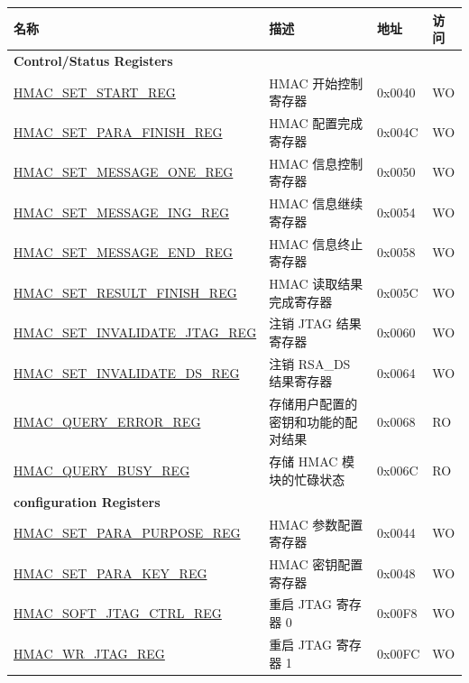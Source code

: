 \begin{longtable}{ | p{6cm} | p{7.2cm} | p{1.3cm} | p{1cm} | }
\hline\rowcolor{lightgray}
名称 & 描述 &  地址 & 访问 \\ \hline
\endhead
\multicolumn{4}{|l|}{\textbf{Control/Status Registers}} \\ \hline
\hyperref[regdesc:HMACSETSTARTREG]{HMAC\_SET\_START\_REG} & HMAC 开始控制寄存器 & 0x0040 & WO \\ \hline
\hyperref[regdesc:HMACSETPARAFINISHREG]{HMAC\_SET\_PARA\_FINISH\_REG} & HMAC 配置完成寄存器 & 0x004C & WO \\ \hline
\hyperref[regdesc:HMACSETMESSAGEONEREG]{HMAC\_SET\_MESSAGE\_ONE\_REG} & HMAC 信息控制寄存器 & 0x0050 & WO \\ \hline
\hyperref[regdesc:HMACSETMESSAGEINGREG]{HMAC\_SET\_MESSAGE\_ING\_REG} & HMAC 信息继续寄存器 & 0x0054 & WO \\ \hline
\hyperref[regdesc:HMACSETMESSAGEENDREG]{HMAC\_SET\_MESSAGE\_END\_REG} & HMAC 信息终止寄存器 & 0x0058 & WO \\ \hline
\hyperref[regdesc:HMACSETRESULTFINISHREG]{HMAC\_SET\_RESULT\_FINISH\_REG} & HMAC 读取结果完成寄存器 & 0x005C & WO \\ \hline
\hyperref[regdesc:HMACSETINVALIDATEJTAGREG]{HMAC\_SET\_INVALIDATE\_JTAG\_REG} & 注销 JTAG 结果寄存器 & 0x0060 & WO \\ \hline
\hyperref[regdesc:HMACSETINVALIDATEDSREG]{HMAC\_SET\_INVALIDATE\_DS\_REG} & 注销 RSA\_DS 结果寄存器 & 0x0064 & WO \\ \hline
\hyperref[regdesc:HMACQUERYERRORREG]{HMAC\_QUERY\_ERROR\_REG} & 存储用户配置的密钥和功能的配对结果 & 0x0068 & RO \\ \hline
\hyperref[regdesc:HMACQUERYBUSYREG]{HMAC\_QUERY\_BUSY\_REG} & 存储 HMAC 模块的忙碌状态 & 0x006C & RO \\ \hline
\multicolumn{4}{|l|}{\textbf{configuration Registers}} \\ \hline
\hyperref[regdesc:HMACSETPARAPURPOSEREG]{HMAC\_SET\_PARA\_PURPOSE\_REG} & HMAC 参数配置寄存器 & 0x0044 & WO \\ \hline
\hyperref[regdesc:HMACSETPARAKEYREG]{HMAC\_SET\_PARA\_KEY\_REG} & HMAC 密钥配置寄存器 & 0x0048 & WO
\\ \hline
\hyperref[regdesc:HMACSOFTJTAGCTRLREG]{HMAC\_SOFT\_JTAG\_CTRL\_REG} & 重启 JTAG 寄存器 0 & 0x00F8 & WO
\\ \hline
\hyperref[regdesc:HMACWRJTAGREG]{HMAC\_WR\_JTAG\_REG} & 重启 JTAG 寄存器 1 & 0x00FC & WO
\\ \hline

\end{longtable}
